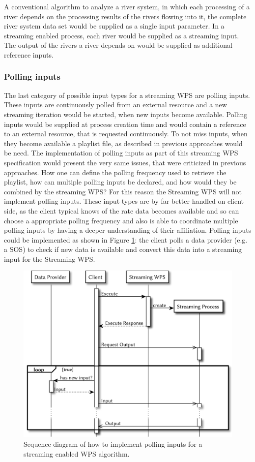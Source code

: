             A conventional algorithm to analyze a river system, in which each processing of a river depends on the processing results of the rivers flowing into it, the complete river system data set would be supplied as a single input parameter. In a streaming enabled process, each river would be supplied as a streaming input. The output of the rivers a river depends on would be supplied as additional reference inputs.
		\subsubsection{Polling inputs}
			\label{sec:stream:input:polling}
			The last category of possible input types for a streaming \ac{WPS} are polling inputs. These inputs are continuously polled from an external resource and a new streaming iteration would be started, when new inputs become available. Polling inputs would be supplied at process creation time and would contain a reference to an external resource, that is requested continuously. To not miss inputs, when they become available a playlist file, as described in previous approaches \citep{foerster2012live} would be need. The implementation of polling inputs as part of this streaming \ac{WPS} specification would present the very same issues, that were criticized in previous approaches. How one can define the polling frequency used to retrieve the playlist, how can multiple polling inputs be declared, and how would they be combined by the streaming \ac{WPS}? For this reason the Streaming \ac{WPS} will not implement polling inputs. These input types are by far better handled on client side, as the client typical knows of the rate data becomes available and so can choose a appropriate polling frequency and also is able to coordinate multiple polling inputs by having a deeper understanding of their affiliation. Polling inputs could be implemented as shown in Figure \ref{fig:sd:polling}: the client polls a data provider (e.g. a \ac{SOS}) to check if new data is available and convert this data into a streaming input for the Streaming \ac{WPS}.
			\begin{figure}[!htb]
				\centering
				\includegraphics[width=.7868\textwidth]{figures/sequence-diagramm-polling.pdf}
				\caption{\label{fig:sd:polling} Sequence diagram of how to implement polling inputs for a streaming enabled WPS algorithm.}
			\end{figure}

